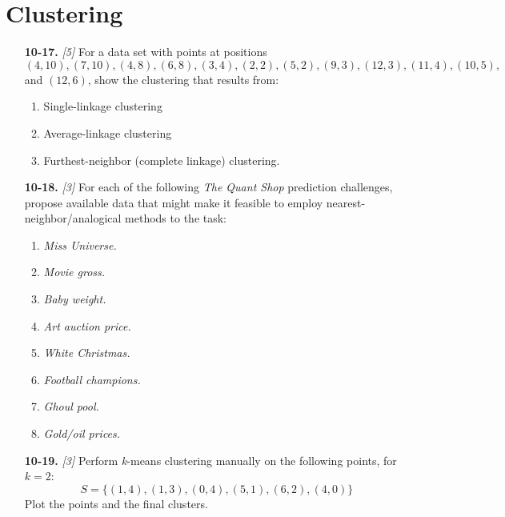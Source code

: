 \documentclass[10pt]{article}
\begin{document}
\section*{Clustering}
\begin{enumerate}
  \setcounter{enumi}{16}
  \item[\textbf{10-17.}] \textit{[5]} For a data set with points at positions $(4,10), (7,10), (4,8), (6,8), (3,4), (2,2), (5,2), (9,3), (12,3), (11,4), (10,5),$ and $(12,6)$, show the clustering that results from:
  \begin{enumerate}
    \item Single-linkage clustering
    \item Average-linkage clustering
    \item Furthest-neighbor (complete linkage) clustering.
  \end{enumerate}
  \item[\textbf{10-18.}] \textit{[3]} For each of the following \textit{The Quant Shop} prediction challenges, propose available data that might make it feasible to employ nearest-neighbor/analogical methods to the task:
  \begin{enumerate}
    \item \textit{Miss Universe.}
    \item \textit{Movie gross.}
    \item \textit{Baby weight.}
    \item \textit{Art auction price.}
    \item \textit{White Christmas.}
    \item \textit{Football champions.}
    \item \textit{Ghoul pool.}
    \item \textit{Gold/oil prices.}
  \end{enumerate}
  \item[\textbf{10-19.}] \textit{[3]} Perform \textit{k}-means clustering manually on the following points, for $k=2$:
  \[
  S=\{(1,4),(1,3),(0,4),(5,1),(6,2),(4,0)\}
  \]
  Plot the points and the final clusters.
  

\end{enumerate}
\end{document}
